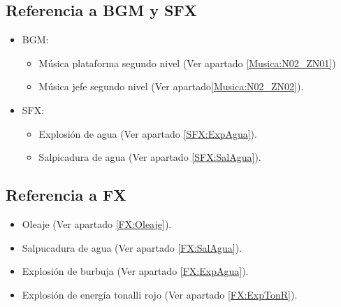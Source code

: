 	\subsection{Referencia a BGM y SFX}
\begin{itemize}
	\item BGM:
		\begin{itemize}
			\item Música plataforma segundo nivel (Ver apartado \ref{Musica:N02_ZN01})
			\item Música jefe segundo nivel (Ver apartado\ref{Musica:N02_ZN02}).
		\end{itemize}
	\item SFX:
		\begin{itemize}
			\item Explosión de agua (Ver apartado \ref{SFX:ExpAgua}).
			\item Salpicadura de agua (Ver apartado \ref{SFX:SalAgua}).
		\end{itemize}
\end{itemize}
	\subsection{Referencia a FX}
\begin{itemize}
	\item Oleaje (Ver apartado \ref{FX:Oleaje}).
	\item Salpucadura de agua (Ver apartado \ref{FX:SalAgua}).
	\item Explosión de burbuja (Ver apartado \ref{FX:ExpAgua}).
	\item Explosión de energía tonalli rojo (Ver apartado \ref{FX:ExpTonR}).
		 
\end{itemize}
